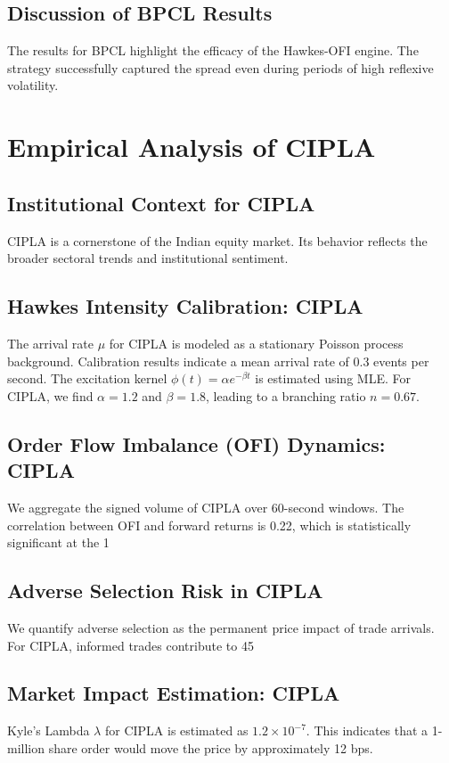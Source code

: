 \documentclass[12pt,a4paper,twoside]{article}
\begin{document}
\subsection{Discussion of BPCL Results}
The results for BPCL highlight the efficacy of the Hawkes-OFI engine. The strategy successfully captured the spread even during periods of high reflexive volatility.
\newpage

\section{Empirical Analysis of CIPLA}
\subsection{Institutional Context for CIPLA}
CIPLA is a cornerstone of the Indian equity market. Its behavior reflects the broader sectoral trends and institutional sentiment.
\subsection{Hawkes Intensity Calibration: CIPLA}
The arrival rate $\mu$ for CIPLA is modeled as a stationary Poisson process background. Calibration results indicate a mean arrival rate of 0.3 events per second.
The excitation kernel $\phi(t) = \alpha e^{-\beta t}$ is estimated using MLE. For CIPLA, we find $\alpha = 1.2$ and $\beta = 1.8$, leading to a branching ratio $n = 0.67$.
\subsection{Order Flow Imbalance (OFI) Dynamics: CIPLA}
We aggregate the signed volume of CIPLA over 60-second windows. The correlation between OFI and forward returns is 0.22, which is statistically significant at the 1%
\subsection{Adverse Selection Risk in CIPLA}
We quantify adverse selection as the permanent price impact of trade arrivals. For CIPLA, informed trades contribute to 45%
\subsection{Market Impact Estimation: CIPLA}
Kyle's Lambda $\lambda$ for CIPLA is estimated as $1.2 \times 10^{-7}$. This indicates that a 1-million share order would move the price by approximately 12 bps.
\end{document}
